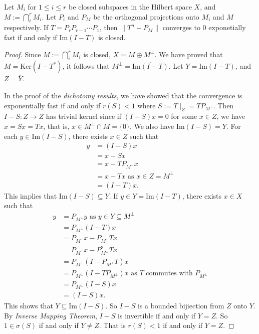 \begin{theorem}
Let $M_i$ for $1\leq i\leq r$ be closed subspaces in the Hilbert space $X$, and $M:=\bigcap_{i}^r M_i.$ Let $P_{i}$ and $P_{M}$ be the orthogonal projections onto $M_i$ and $M$ respectively. If $T=P_rP_{r-1}\cdots P_1$, then $\|T^n-P_M\|$ converges to $0$ exponetially fast if and only if $\mathrm{Im}(I-T)$ is closed.
\begin{proof}
Since $M:=\bigcap_{i}^r M_i$ is closed, $X=M\oplus M^{\perp}$. We have proved that $M=\mathrm{Ker}(I-T^{\ast})$, it follows that $M^{\perp}=\overline{\mathrm{Im}(I-T)}$. Let $	Y=\mathrm{Im}(I-T)$, and $Z=\overline{Y}$.

In the proof of the \emph{dichotomy results}, we have showed that the convergence is exponentially fast if and only if $r(S)<1$ where $S:=T\mid_{Z}=TP_{M^{\perp}}$.
Then $I-S\colon Z\to Z$ has trivial kernel since if
$(I-S)x=0$ for some $x\in Z$, we have $x=Sx=Tx$, that is, $x\in M^{\perp}\cap M=\{0\}$. 
We also have $\mathrm{Im}(I-S)=Y$. For each $y\in \mathrm{Im}(I-S)$, there exists $x\in Z$ such that 
\begin{align*}
y&=(I-S)x\\
{}&=x-Sx \\
{}&=x-TP_{M^{\perp}}x \\
{}&=x-Tx  \mbox{ as } x\in Z=M^{\perp}\\
{}&=(I-T)x. 
\end{align*}
This implies that $\mathrm{Im}(I-S)\subseteq Y$.
If $y\in Y=\mathrm{Im}(I-T)$, there exists $x\in X$ such that 
\begin{align*}
y&=P_{M^{\perp}}y \mbox{ as } y\in Y\subseteq M^{\perp}\\
{}&=P_{M^{\perp}}(I-T)x \\
{}&=P_{M^{\perp}}x-P_{M^{\perp}}Tx \\
{}&=P_{M^{\perp}}x-P_{M^{\perp}}^{2}Tx \\
{}&=P_{M^{\perp}}(I-P_{M^{\perp}}T)x\\
{}&=P_{M^{\perp}}(I-TP_{M^{\perp}})x \mbox{ as } T \mbox{ commutes with } P_{M^{\perp}} \\
{}&=P_{M^{\perp}}(I-S)x \\
{}&=(I-S)x.
\end{align*}
This shows that $Y\subseteq \mathrm{Im}(I-S)$.
So $I-S$ is a bounded bijiection from $Z$ onto $Y$. By \emph{Inverse Mapping Theorem}, $I-S$ is invertible if and only if $Y=Z$. So $1\in \sigma(S)$ if and only if $Y\neq Z$. That is $r(S)<1$ if and only if $Y=Z$.
\end{proof}
\end{theorem}